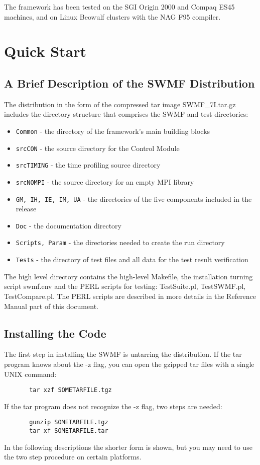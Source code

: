 The framework has been tested on the SGI Origin 2000 and Compaq ES45
machines, and on Linux Beowulf clusters with the NAG F95 compiler.


\chapter{Quick Start}

\section{A Brief Description of the SWMF Distribution}

The distribution in the form of the compressed tar image
SWMF\_7I.tar.gz includes the directory structure that comprises the
SWMF and test directories:
\begin{itemize}
\item {\tt Common} - the directory of the framework's main building blocks
\item {\tt srcCON} - the source directory for the Control Module
\item {\tt srcTIMING} - the time profiling source directory
\item {\tt srcNOMPI} - the source directory for an empty MPI library
\item {\tt GM, IH, IE, IM, UA} - the directories of the five
components included in the release
\item {\tt Doc} - the documentation directory
\item {\tt Scripts, Param} - the directories needed to create the run directory
\item {\tt Tests} - the directory of test files and all data for the
                    test result verification
\end{itemize}
The high level directory contains the high-level Makefile, the installation 
turning script swmf.env and the PERL scripts for testing: TestSuite.pl, 
TestSWMF.pl, TestCompare.pl.
The PERL scripts are described in more details in the Reference Manual part of 
this document. 

\section{Installing the Code}

The first step in installing the SWMF is untarring the distribution.
If the tar program knows about the -z flag, you can open the gzipped
tar files with a single UNIX command:
\begin{verbatim}
       tar xzf SOMETARFILE.tgz
\end{verbatim}
If the tar program does not recognize the -z flag, two steps are needed:
\begin{verbatim}
       gunzip SOMETARFILE.tgz
       tar xf SOMETARFILE.tar
\end{verbatim}
In the following descriptions the shorter form is shown, but you may
need to use the two step procedure on certain platforms.

